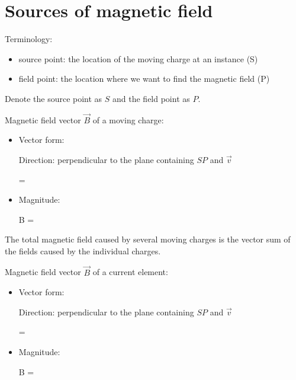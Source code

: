 \chapter{Sources of magnetic field}

  \par Terminology:
    \begin{itemize}
      \item source point: the location of the moving charge at an instance (S)
      \item field point: the location where we want to find the magnetic field (P)
    \end{itemize}

  \par Denote the source point as $S$ and the field point as $P$.
  \par Magnetic field vector $\vec{B}$ of a moving charge:
    \begin{itemize}
      \item Vector form:
        \par Direction: perpendicular to the plane containing $SP$ and $\vec{v}$
      \begin{eqbox}
         =  
      \end{eqbox}
      \item Magnitude:
      \begin{eqbox}
        B =  
      \end{eqbox}
    \end{itemize}


  \par The total magnetic field caused by several moving charges is the vector
    sum of the fields caused by the individual charges.
  \par Magnetic field vector $\vec{B}$ of a current element:
    \begin{itemize}
      \item Vector form:
        \par Direction: perpendicular to the plane containing $SP$ and $\vec{v}$
      \begin{eqbox}
         =  \INT {}
      \end{eqbox}
      \item Magnitude:
      \begin{eqbox}
        B =  
      \end{eqbox}
    \end{itemize}



